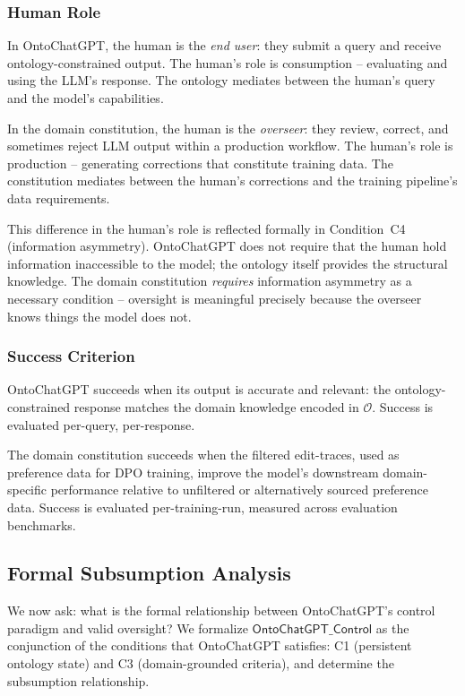 \documentclass[11pt]{article}
\begin{document}
\subsubsection{Human Role}

In OntoChatGPT, the human is the \emph{end user}: they submit a query and receive ontology-constrained output.
The human's role is consumption -- evaluating and using the LLM's response.
The ontology mediates between the human's query and the model's capabilities.

In the domain constitution, the human is the \emph{overseer}: they review, correct, and sometimes reject LLM output within a production workflow.
The human's role is production -- generating corrections that constitute training data.
The constitution mediates between the human's corrections and the training pipeline's data requirements.

This difference in the human's role is reflected formally in Condition~C4 (information asymmetry).
OntoChatGPT does not require that the human hold information inaccessible to the model; the ontology itself provides the structural knowledge.
The domain constitution \emph{requires} information asymmetry as a necessary condition -- oversight is meaningful precisely because the overseer knows things the model does not.

\subsubsection{Success Criterion}

OntoChatGPT succeeds when its output is accurate and relevant: the ontology-constrained response matches the domain knowledge encoded in $\mathcal{O}$.
Success is evaluated per-query, per-response.

The domain constitution succeeds when the filtered edit-traces, used as preference data for DPO training, improve the model's downstream domain-specific performance relative to unfiltered or alternatively sourced preference data.
Success is evaluated per-training-run, measured across evaluation benchmarks.

\subsection{Formal Subsumption Analysis}
\label{sec:subsumption}

We now ask: what is the formal relationship between OntoChatGPT's control paradigm and valid oversight?
We formalize $\mathsf{OntoChatGPT\_Control}$ as the conjunction of the conditions that OntoChatGPT satisfies: C1 (persistent ontology state) and C3 (domain-grounded criteria), and determine the subsumption relationship.
\end{document}
